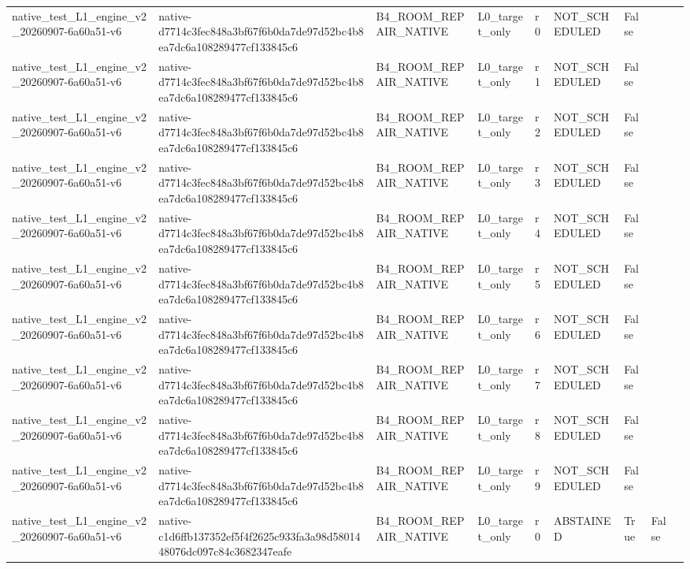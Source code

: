 \begin{tabular}{lllllllll}
native\_test\_L1\_engine\_v2\_20260907-6a60a51-v6 & native-d7714c3fec848a3bf67f6b0da7de97d52bc4b8ea7dc6a108289477cf133845c6 & B4\_ROOM\_REPAIR\_NATIVE & L0\_target\_only & r0 & NOT\_SCHEDULED & False &  &  \\
native\_test\_L1\_engine\_v2\_20260907-6a60a51-v6 & native-d7714c3fec848a3bf67f6b0da7de97d52bc4b8ea7dc6a108289477cf133845c6 & B4\_ROOM\_REPAIR\_NATIVE & L0\_target\_only & r1 & NOT\_SCHEDULED & False &  &  \\
native\_test\_L1\_engine\_v2\_20260907-6a60a51-v6 & native-d7714c3fec848a3bf67f6b0da7de97d52bc4b8ea7dc6a108289477cf133845c6 & B4\_ROOM\_REPAIR\_NATIVE & L0\_target\_only & r2 & NOT\_SCHEDULED & False &  &  \\
native\_test\_L1\_engine\_v2\_20260907-6a60a51-v6 & native-d7714c3fec848a3bf67f6b0da7de97d52bc4b8ea7dc6a108289477cf133845c6 & B4\_ROOM\_REPAIR\_NATIVE & L0\_target\_only & r3 & NOT\_SCHEDULED & False &  &  \\
native\_test\_L1\_engine\_v2\_20260907-6a60a51-v6 & native-d7714c3fec848a3bf67f6b0da7de97d52bc4b8ea7dc6a108289477cf133845c6 & B4\_ROOM\_REPAIR\_NATIVE & L0\_target\_only & r4 & NOT\_SCHEDULED & False &  &  \\
native\_test\_L1\_engine\_v2\_20260907-6a60a51-v6 & native-d7714c3fec848a3bf67f6b0da7de97d52bc4b8ea7dc6a108289477cf133845c6 & B4\_ROOM\_REPAIR\_NATIVE & L0\_target\_only & r5 & NOT\_SCHEDULED & False &  &  \\
native\_test\_L1\_engine\_v2\_20260907-6a60a51-v6 & native-d7714c3fec848a3bf67f6b0da7de97d52bc4b8ea7dc6a108289477cf133845c6 & B4\_ROOM\_REPAIR\_NATIVE & L0\_target\_only & r6 & NOT\_SCHEDULED & False &  &  \\
native\_test\_L1\_engine\_v2\_20260907-6a60a51-v6 & native-d7714c3fec848a3bf67f6b0da7de97d52bc4b8ea7dc6a108289477cf133845c6 & B4\_ROOM\_REPAIR\_NATIVE & L0\_target\_only & r7 & NOT\_SCHEDULED & False &  &  \\
native\_test\_L1\_engine\_v2\_20260907-6a60a51-v6 & native-d7714c3fec848a3bf67f6b0da7de97d52bc4b8ea7dc6a108289477cf133845c6 & B4\_ROOM\_REPAIR\_NATIVE & L0\_target\_only & r8 & NOT\_SCHEDULED & False &  &  \\
native\_test\_L1\_engine\_v2\_20260907-6a60a51-v6 & native-d7714c3fec848a3bf67f6b0da7de97d52bc4b8ea7dc6a108289477cf133845c6 & B4\_ROOM\_REPAIR\_NATIVE & L0\_target\_only & r9 & NOT\_SCHEDULED & False &  &  \\
native\_test\_L1\_engine\_v2\_20260907-6a60a51-v6 & native-c1d6ffb137352ef5f4f2625c933fa3a98d5801448076dc097c84c3682347eafe & B4\_ROOM\_REPAIR\_NATIVE & L0\_target\_only & r0 & ABSTAINED & True & False &  \\

\end{tabular}

